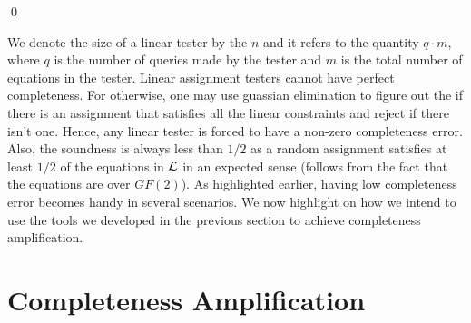 \begin{itemize}
\end{itemize}

\qed

We denote the {\sf size} of a linear tester by the $n$ and it refers
to the quantity $q \cdot m$, where $q$ is the number of queries made
by the tester and $m$ is the total number of equations in the
tester. Linear assignment testers cannot have perfect completeness.
For otherwise, one may use guassian elimination to figure out the if
there is an assignment that satisfies all the linear constraints and
reject if there isn't one. Hence, any linear tester is forced to have
a non-zero completeness error. Also, the soundness is always less than
$1/2$ as a random assignment satisfies at least $1/2$ of the equations
in ${\cal L}$ in an expected sense (follows from the fact that the
equations are over ${GF}(2)$). As highlighted earlier, having low
completeness error becomes handy in several scenarios. We now
highlight on how we intend to use the tools we developed in the
previous section to achieve completeness amplification.


\section{Completeness Amplification}  \label{section:complete}

